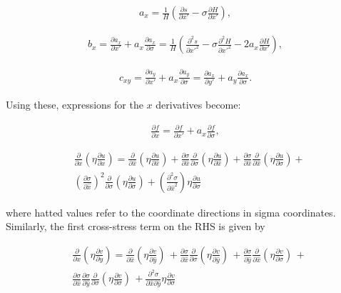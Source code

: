 \begin{align*}
a_{x} = \frac{1}{H}(\frac{\partial s}{\partial x'} - \sigma \frac{\partial H}{\partial x'}),
\end{align*}

\begin{align*}
b_{x} = \frac{\partial a_x}{\partial x'} + a_x \frac{\partial a_x}{\partial \sigma} 
    = \frac{1}{H} (\frac{\partial^2 s}{\partial x'^2} - \sigma \frac{\partial^2 H}{\partial x'^2} - 2a_x \frac{\partial H}{\partial x'}),
\end{align*}

\begin{align*}
c_{xy} = \frac{\partial a_y}{\partial x'} + a_x \frac{\partial a_y}{\partial \sigma} 
       = \frac{\partial a_x}{\partial y'} + a_y \frac{\partial a_x}{\partial \sigma}.
\end{align*}

Using these, expressions for the $x$ derivatives become:

\begin{align*}
\frac{\partial f}{\partial x} = \frac{\partial f}{\partial x'} + a_x \frac{\partial f}{\partial \sigma},
\end{align*}

\begin{align*}
 & \frac{\partial }{\partial x}\left( \eta \frac{\partial u}{\partial x} \right)=\frac{\partial }{\partial \hat{x}}\left( \eta \frac{\partial u}{\partial \hat{x}} \right)+\frac{\partial \sigma }{\partial \hat{x}}\frac{\partial }{\partial \sigma }\left( \eta \frac{\partial u}{\partial \hat{x}} \right)+\frac{\partial \sigma }{\partial \hat{x}}\frac{\partial }{\partial \hat{x}}\left( \eta \frac{\partial u}{\partial \sigma } \right)+ \\
& \left( \frac{\partial \sigma }{\partial \hat{x}} \right)^{2}\frac{\partial }{\partial \sigma }\left( \eta \frac{\partial u}{\partial \sigma } \right)+\left( \frac{\partial _{{}}^{2}\sigma }{\partial \hat{x}_{{}}^{2}} \right)\eta \frac{\partial u}{\partial \sigma }
\end{align*}

where hatted values refer to the coordinate directions in sigma coordinates. Similarly, the first cross-stress term on the RHS is given by

\begin{align*}
&\frac{\partial }{\partial x}\left( \eta \frac{\partial v}{\partial y} \right)=\frac{\partial }{\partial \hat{x}}\left( \eta \frac{\partial v}{\partial \hat{y}} \right)\,+\frac{\partial \sigma }{\partial \hat{x}}\frac{\partial }{\partial \sigma }\left( \eta \frac{\partial v}{\partial \hat{y}} \right)\,+\frac{\partial \sigma }{\partial \hat{y}}\frac{\partial }{\partial \hat{x}}\left( \eta \frac{\partial v}{\partial \sigma } \right)\,+ \\
&\frac{\partial \sigma }{\partial \hat{x}}\frac{\partial \sigma }{\partial \hat{y}}\frac{\partial }{\partial \sigma }\left( \eta \frac{\partial v}{\partial \sigma } \right)\,+\frac{\partial _{{}}^{2}\sigma }{\partial \hat{x}\partial \hat{y}}\eta \frac{\partial v}{\partial \sigma }\,
\end{align*}


